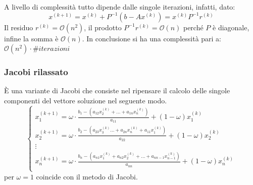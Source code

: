 A livello di complessità tutto dipende dalle singole iterazioni, infatti, dato:
\begin{equation*}
    x^{(k + 1)} = x^{(k)} + P^{-1}(b - Ax^{(k)}) = x^{(k)}P^{-1}r^{(k)}
\end{equation*}
Il residuo $r^{(k)} = \mathcal{O}(n^2)$, il prodotto $P^{-1}r^(k) = \mathcal{O}(n)$
perché $P$ è diagonale, infine la somma è $\mathcal{O}(n)$. In conclusione si ha
una complessità pari a: $\mathcal{O}(n^2)\cdot \#iterazioni$
\subsubsection{Jacobi rilassato}
È una variante di Jacobi che consiste nel ripensare il calcolo delle singole
componenti del vettore soluzione nel seguente modo.
\begin{equation*}
    \begin{cases}
        x_1^{(k+1)} = \omega \cdot \frac{b_1 - (a_{12} x_2^{(k)} + \dots + a_{1n} x_n^{(k)})}{ a_{11}} +(1-\omega) x_1^{(k)}                      \\
        x_2^{(k+1)} =\omega \cdot \frac{ b_2 - (a_{23} x_3^{(k)}\dots + a_{2n} x_n^{(k)} + a_{11}x_1^{(k)})}{a_{22}}+(1-\omega) x_2^{(k)}         \\
        \vdots                                                                                                                                    \\
        x_n^{(k+1)}= \omega \cdot \frac{b_n - (a_{n1}x_1^{(k)} + a_{n2} x_2^{(k)} + \dots + a_{nn-1} x_{n-1}^{(k)})}{a_{nn}}+(1-\omega) x_n^{(k)} \\
    \end{cases}
\end{equation*}
per $\omega = 1$ coincide con il metodo di Jacobi.

